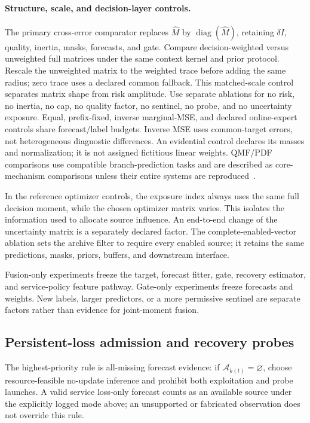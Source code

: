 \documentclass[10pt]{article}
\DeclareMathOperator{\diag}{diag}
\begin{document}
\paragraph{Structure, scale, and decision-layer controls.}
The primary cross-error comparator replaces $\widehat M$ by
$\diag(\widehat M)$, retaining $\delta I$, quality, inertia, masks, forecasts,
and gate. Compare decision-weighted versus unweighted full matrices under the
same context kernel and prior protocol. Rescale the unweighted matrix to the
weighted trace before adding the same radius; zero trace uses a declared common
fallback. This matched-scale control separates matrix shape from risk amplitude.
Use separate ablations for no risk, no inertia, no cap, no quality factor,
no sentinel, no probe, and no uncertainty exposure. Equal, prefix-fixed, inverse
marginal-MSE, and declared online-expert controls share forecast/label budgets.
Inverse MSE uses common-target errors, not heterogeneous diagnostic differences.
An evidential control declares its masses and normalization; it is not assigned
fictitious linear weights. QMF/PDF comparisons use compatible branch-prediction
tasks and are described as core-mechanism comparisons unless their entire
systems are reproduced~\cite{qmf2023,pdf2024}.

In the reference optimizer controls, the exposure index always uses the same
full decision moment, while the chosen optimizer matrix varies. This isolates
the information used to allocate source influence. An end-to-end change of the
uncertainty matrix is a separately declared factor. The complete-enabled-vector
ablation sets the archive filter to require every enabled source; it retains
the same predictions, masks, priors, buffers, and downstream interface.

Fusion-only experiments freeze the target, forecast fitter, gate, recovery
estimator, and service-policy feature pathway. Gate-only experiments freeze
forecasts and weights. New labels, larger predictors, or a more permissive
sentinel are separate factors rather than evidence for joint-moment fusion.

\subsection{Persistent-loss admission and recovery probes}
\label{sec:coordination}

The highest-priority rule is all-missing forecast evidence: if
$\mathcal A_{k(t)}=\varnothing$, choose resource-feasible no-update inference
and prohibit both exploitation and probe launches. A valid service loss-only
forecast counts as an available source under the explicitly logged mode above;
an unsupported or fabricated observation does not override this rule.
\end{document}
